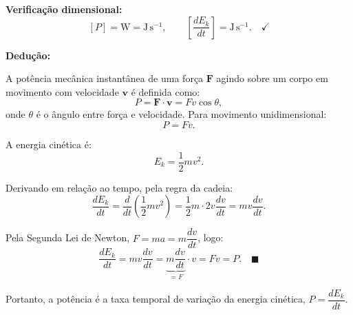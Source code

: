 \textbf{Verificação dimensional:}
\[
[P]=\mathrm{W}=\mathrm{J\,s^{-1}},\qquad \left[\frac{dE_k}{dt}\right]=\mathrm{J\,s^{-1}}.\quad\checkmark
\]

\textbf{Dedução:}

A potência mecânica instantânea de uma força $\mathbf{F}$ agindo sobre um corpo em movimento com velocidade $\mathbf{v}$ é definida como:
\[
P = \mathbf{F}\cdot\mathbf{v} = Fv\cos\theta,
\]
onde $\theta$ é o ângulo entre força e velocidade. Para movimento unidimensional:
\[
P = Fv.
\]

A energia cinética é:
\[
E_k=\frac{1}{2}mv^2.
\]

Derivando em relação ao tempo, pela regra da cadeia:
\[
\frac{dE_k}{dt}=\frac{d}{dt}\!\left(\frac{1}{2}mv^2\right)=\frac{1}{2}m\cdot 2v\frac{dv}{dt}=mv\frac{dv}{dt}.
\]

Pela Segunda Lei de Newton, $F=ma=m\dfrac{dv}{dt}$, logo:
\[
\frac{dE_k}{dt}=mv\frac{dv}{dt}=\underbrace{m\frac{dv}{dt}}_{=F}\cdot v = Fv = P.\quad\blacksquare
\]

Portanto, a potência é a taxa temporal de variação da energia cinética, $P=\dfrac{dE_k}{dt}$.

